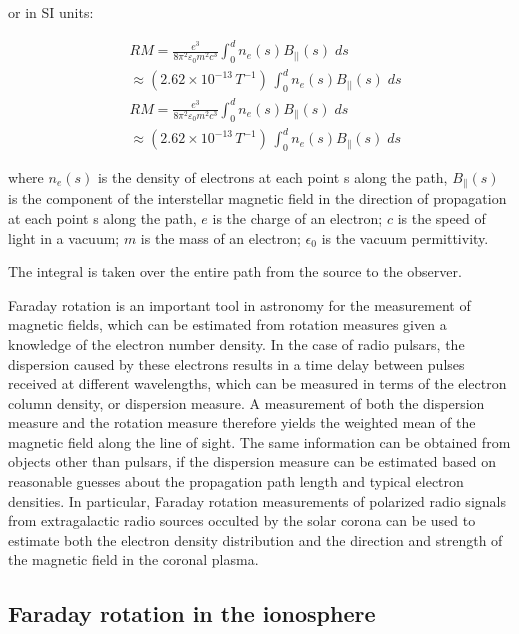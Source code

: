 \documentclass[main.tex]{subfiles}
\begin{document}
or in SI units:

\begin{align*}
 &RM =\frac{e^{3}}{8\pi^{2}\varepsilon_{0}m^2c^3}\int_0^dn_{e}(s)B_{||}(s)\;ds\\
 &\approx (2.62\times 10^{-13}\,T^{-1})\,\int_0^dn_{e}(s)B_{||}(s)\;ds\\
 &RM=\frac{e^{3}}{8\pi^2\varepsilon_{0}m^2c^3}\int_0^dn_{e}(s)B_{\parallel}(s)\;ds\\
 &\approx (2.62\times 10^{-13}\,T^{-1})\,\int_0^dn_{e}(s)B_{\parallel}(s)\;ds
\end{align*}

where $n_e(s)$ is the density of electrons at each point s along the path, $B_{\parallel}(s)$ is the component of the interstellar magnetic field in the direction of propagation at each point s along the path, $e$ is the charge of an electron; $c$ is the speed of light in a vacuum; $m$ is the mass of an electron; $\epsilon_{0}$ is the vacuum permittivity.

The integral is taken over the entire path from the source to the observer.

Faraday rotation is an important tool in astronomy for the measurement of magnetic fields, which can be estimated from rotation measures given a knowledge of the electron number density. In the case of radio pulsars, the dispersion caused by these electrons results in a time delay between pulses received at different wavelengths, which can be measured in terms of the electron column density, or dispersion measure. A measurement of both the dispersion measure and the rotation measure therefore yields the weighted mean of the magnetic field along the line of sight. The same information can be obtained from objects other than pulsars, if the dispersion measure can be estimated based on reasonable guesses about the propagation path length and typical electron densities. In particular, Faraday rotation measurements of polarized radio signals from extragalactic radio sources occulted by the solar corona can be used to estimate both the electron density distribution and the direction and strength of the magnetic field in the coronal plasma.

\subsection{Faraday rotation in the ionosphere}
\end{document}
